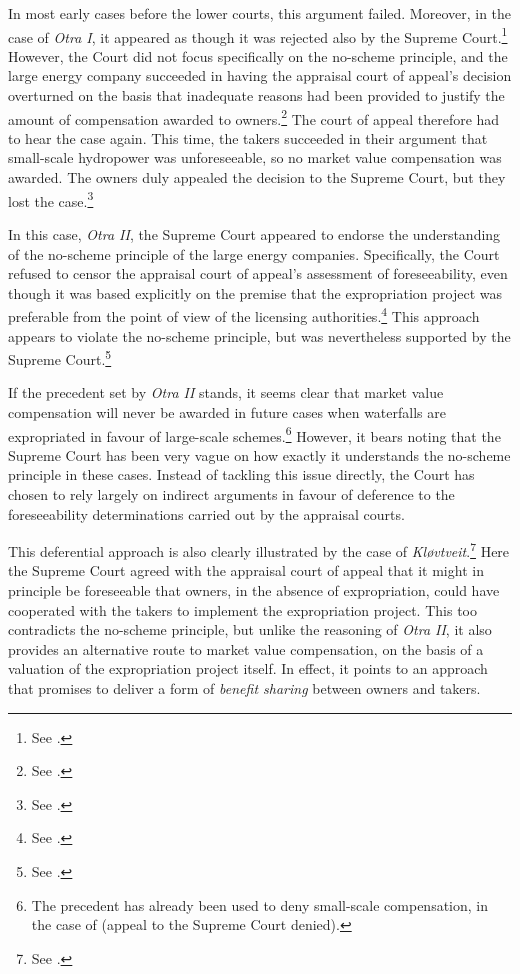 In most early cases before the lower courts, this argument failed. Moreover, in the case of {\it Otra I}, it appeared as though it was rejected also by the Supreme Court.\footnote{See \cite[31-48]{otra10}.} However, the Court did not focus specifically on the no-scheme principle, and the large energy company succeeded in having the appraisal court of appeal's decision overturned on the basis that inadequate reasons had been provided to justify the amount of compensation awarded to owners.\footnote{See \cite[52]{otra10}.} The court of appeal therefore had to hear the case again. This time, the takers succeeded in their argument that small-scale hydropower was unforeseeable, so no market value compensation was awarded. The owners duly appealed the decision to the Supreme Court, but they lost the case.\footnote{See \cite{otra13}.}

In this case, {\it Otra II}, the Supreme Court appeared to endorse the understanding of the no-scheme principle of the large energy companies. Specifically, the Court refused to censor the appraisal court of appeal's assessment of foreseeability, even though it was based explicitly on the premise that the expropriation project was preferable from the point of view of the licensing authorities.\footnote{See \cite[53]{otra13}.} This approach appears to violate the no-scheme principle, but was nevertheless supported by the Supreme Court.\footnote{See \cite[54]{otra13}.}

If the precedent set by {\it Otra II} stands, it seems clear that market value compensation will never be awarded in future cases when waterfalls are expropriated in favour of large-scale schemes.\footnote{The precedent has already been used to deny small-scale compensation, in the case of \cite{smibelg15} (appeal to the Supreme Court denied).} However, it bears noting that the Supreme Court has been very vague on how exactly it understands the no-scheme principle in these cases. Instead of tackling this issue directly, the Court has chosen to rely largely on indirect arguments in favour of deference to the foreseeability determinations carried out by the appraisal courts.

This deferential approach is also clearly illustrated by the case of {\it Kløvtveit}.\footnote{See \cite{klovtveit11}.} Here the Supreme Court agreed with the appraisal court of appeal that it might in principle be foreseeable that owners, in the absence of expropriation, could have cooperated with the takers to implement the expropriation project. This too contradicts the no-scheme principle, but unlike the reasoning of {\it Otra II}, it also provides an alternative route to market value compensation, on the basis of a valuation of the expropriation project itself. In effect, it points to an approach that promises to deliver a form of {\it benefit sharing} between owners and takers. 

